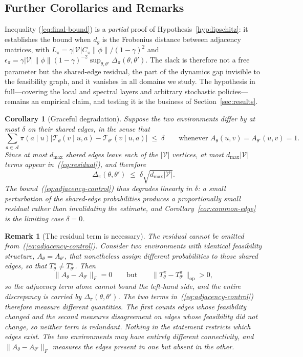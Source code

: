 \documentclass[twoside]{article}
\newtheorem{corollary}[theorem]{Corollary}
\newtheorem{remark}[theorem]{Remark}
\begin{document}
\subsection{Further Corollaries and Remarks}
\noindent Inequality (\ref{eq:final-bound}) is a \emph{partial} proof of Hypothesis~\ref{hyp:lipschitz}: it establishes the bound when $d_g$ is the Frobenius distance between adjacency matrices, with $L_\pi = \gamma|\mathcal V| C_\pi \|\phi\|/(1-\gamma)^2$ and $\epsilon_\pi = \gamma|\mathcal V|\|\phi\|(1-\gamma)^{-2}\sup_{\theta,\theta'}\Delta_\pi(\theta,\theta')$. The slack is therefore not a free parameter but the shared-edge residual, the part of the dynamics gap invisible to the feasibility graph, and it vanishes in all domains we study. The hypothesis in full---covering the local and spectral layers and arbitrary stochastic policies---remains an empirical claim, and testing it is the business of Section~\ref{sec:results}.



\begin{corollary}[Graceful degradation]
\label{cor:degradation}
Suppose the two environments differ by at most $\delta$ on their shared
edges, in the sense that
\[
    \sum_{a\in\mathcal A}
    \pi(a\mid u)
    \bigl|
        \mathcal T_\theta(v\mid u,a)-\mathcal T_{\theta'}(v\mid u,a)
    \bigr|
    \;\le\;
    \delta
    \qquad
    \text{whenever } A_\theta(u,v)=A_{\theta'}(u,v)=1 .
\]
Since at most $d_{\max}$ shared edges leave each of the $|\mathcal V|$
vertices, at most $d_{\max}|\mathcal V|$ terms appear
in~(\ref{eq:residual}), and therefore
\[
    \Delta_\pi(\theta,\theta')
    \;\le\;
    \delta\sqrt{d_{\max}|\mathcal V|} .
\]
The bound~(\ref{eq:adjacency-control}) thus degrades linearly in
$\delta$: a small perturbation of the shared-edge probabilities produces
a proportionally small residual rather than invalidating the estimate,
and Corollary~\ref{cor:common-edge} is the limiting case $\delta=0$.
\end{corollary}

\begin{remark}[The residual term is necessary]
\label{rem:residual-sharp}
The residual cannot be omitted from~(\ref{eq:adjacency-control}).
Consider two environments with identical feasibility structure,
$A_\theta=A_{\theta'}$, that nonetheless assign different probabilities
to those shared edges, so that $T^\pi_\theta\neq T^\pi_{\theta'}$. Then
\[
    \|A_\theta-A_{\theta'}\|_F=0
    \qquad
    \text{but}
    \qquad
    \|T^\pi_\theta-T^\pi_{\theta'}\|_{\mathrm{op}}>0,
\]
so the adjacency term alone cannot bound the left-hand side, and the
entire discrepancy is carried by $\Delta_\pi(\theta,\theta')$. The two
terms in~(\ref{eq:adjacency-control}) therefore measure different
quantities. The first counts edges whose feasibility changed and the
second measures disagreement on edges whose feasibility did not change,
so neither term is redundant. Nothing in the statement restricts which
edges exist. The two environments may have entirely different
connectivity, and $\|A_\theta-A_{\theta'}\|_F$ measures the edges present
in one but absent in the other.
\end{remark}
\end{document}
